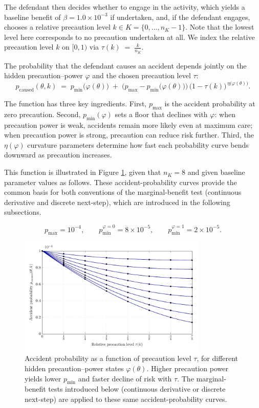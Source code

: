 \documentclass{article}
\begin{document}
The defendant then decides whether to engage in the activity, which yields a baseline benefit of $\beta = 1.0 \times 10^{-3}$ if undertaken, and, if the defendant engages, chooses a relative precaution level $k \in K = \{0,\dots,n_K-1\}$. Note that the lowest level here corresponds to no precaution undertaken at all. We index the relative precaution level $k$ on $[0,1)$ via $\tau(k) \;=\; \frac{k}{n_K }$.

The probability that the defendant causes an accident depends jointly on the hidden precaution–power $\varphi$ and the chosen precaution level $\tau$:
\[
p_{\mathrm{caused}}(\theta,k)
\;=\;
p_{\min}\!\bigl(\varphi(\theta)\bigr)
\;+\;
\bigl(p_{\max}-p_{\min}\!\bigl(\varphi(\theta)\bigr)\bigr)\,
\bigl(1-\tau(k)\bigr)^{\,\eta\!\bigl(\varphi(\theta)\bigr)}.
\]

The function has three key ingredients. First, $p_{\max}$ is the accident probability at zero precaution. Second, $p_{\min}(\varphi)$ sets a floor that declines with $\varphi$: when precaution power is weak, accidents remain more likely even at maximum care; when precaution power is strong, precaution can reduce risk further. Third, the  $\eta(\varphi)$ curvature parameters determine how fast each probability curve bends downward as precaution increases.

This function is illustrated in Figure \ref{fig:precaution}, given that $n_K = 8$ and given baseline parameter values as follows. These accident-probability curves provide the common basis for both conventions of the marginal-benefit test (continuous derivative and discrete next-step), which are introduced in the following subsections.

\[
p_{\max}=10^{-4}, \qquad 
p_{\min}^{\varphi=0}=8\times 10^{-5}, \qquad 
p_{\min}^{\varphi=1}=2\times 10^{-5}.
\]

\begin{figure}[t]
  \centering
  \includegraphics[width=0.8\textwidth]{../Figures/precaution.pdf}
\caption{Accident probability as a function of precaution level $\tau$, for different hidden precaution–power states $\varphi(\theta)$. Higher precaution power yields lower $p_{\min}$ and faster decline of risk with $\tau$. The marginal-benefit tests introduced below (continuous derivative or discrete next-step) are applied to these same accident-probability curves.}
  \label{fig:precaution}
\end{figure}
\end{document}
